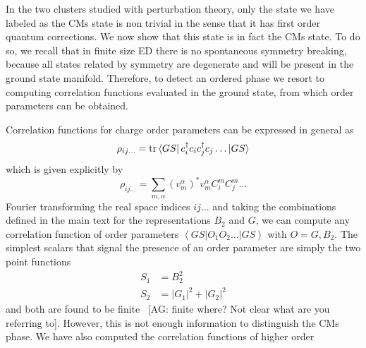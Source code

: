 \documentclass[aps,prx,10pt,twocolumn,floatfix,superscriptaddress,showpacs,numerical,footinbib]{revtex4-1}
\newcommand{\noteAG}[1]{{\color{blue} [AG: #1]}}
\begin{document}
%
In the two clusters studied with perturbation theory, only the state we have labeled as the CMs state is non trivial in the sense that it has first order quantum corrections.
%
We now show that this state is in fact the CMs state. 
%
To do so, we recall that in finite size ED there is no spontaneous symmetry breaking, because all states related by symmetry are degenerate and will be present in the ground state manifold.
%
Therefore, to detect an ordered phase we resort to computing correlation functions evaluated in the ground state, from which order parameters can be obtained. 
%
 
Correlation functions for charge order parameters can be expressed in general as
\begin{equation}
\rho_{ij\ldots} = {\rm tr} \left< GS \right| c^\dagger_i c_ic^\dagger_j c_j \ldots \left| GS \right> 
\end{equation}
which is given explicitly by
\begin{equation}
\rho_{ij\ldots} = \sum_{m,\alpha} (v_m^\alpha)^*v_m^\alpha C^m_i C^m_j \dots
\end{equation}
Fourier transforming the real space indices $ij\ldots$ and taking the combinations defined in the main text for the representations $B_2$ and $G$, we can compute any correlation function of order parameters $\left< GS \right| O_1 O_2 \ldots \left| GS \right> $ with $O = G, B_2$. 
%
The simplest scalars that signal the presence of an order parameter are simply the two point functions
\begin{align}
S_1 &= B_2^2 \\
S_2 &= |G_1|^2+|G_2|^2 
\end{align}
and both are found to be finite~\noteAG{finite where? Not clear what are you referring to}. However, this is not enough information to distinguish the CMs phase. We have also computed the correlation functions of higher order

\end{document}
